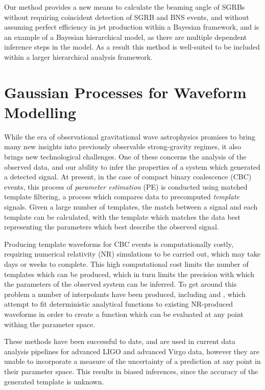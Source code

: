 \documentclass{kentigern}
\theoremstyle{definition}
\begin{document}
Our method provides a new means to calculate the beaming angle of
SGRBs without requiring coincident detection of SGRB and BNS events,
and without assuming perfect efficiency in jet production within a
Bayesian framework, and is an example of a Bayesian hierarchical
model, as there are multiple dependent inference steps in the
model. As a result this method is well-suited to be included within a
larger hierarchical analysis framework.


\section{Gaussian Processes for Waveform Modelling}

While the era of observational gravitational wave astrophysics
promises to bring many new insights into previously observable
strong-gravity regimes, it also brings new technological
challenges. One of these concerns the analysis of the observed data,
and our ability to infer the properties of a system which generated a
detected signal. At present, in the case of compact binary coalescence
(CBC) events, this process of \emph{parameter estimation} (PE) is
conducted using matched template filtering, a process which compares
data to precomputed \emph{template} signals. Given a large number of
templates, the match between a signal and each template can be
calculated, with the template which matches the data best representing
the parameters which best describe the observed signal.

Producing template waveforms for CBC events is computationally costly,
requiring numerical relativity (NR) simulations to be carried out,
which may take days or weeks to complete. This high computational cost
limits the number of templates which can be produced, which in turn
limits the precision with which the parameters of the observed system
can be inferred. To get around this problem a number of interpolants
have been produced, including \imrp{} and \seobnr{}, which attempt to
fit deterministic analytical functions to existing NR-produced
waveforms in order to create a function which can be evaluated at any
point withing the parameter space.

These methods have been successful to date, and are used in current
data analysis pipelines for advanced LIGO and advanced Virgo data,
however they are unable to incorporate a measure of the uncertainty of
a prediction at any point in their parameter space. This results in
biased inferences, since the accuracy of the generated template is
unknown.
\end{document}
